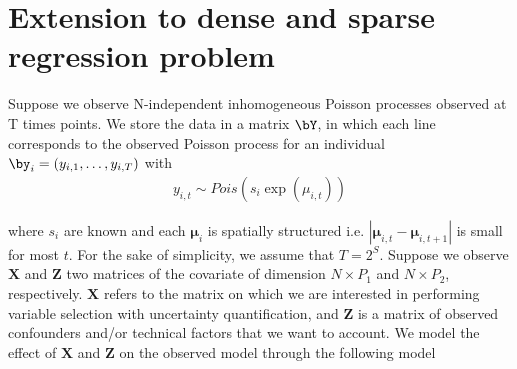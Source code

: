 





\section{Extension to dense and sparse regression problem }


  Suppose we observe N-independent inhomogeneous Poisson processes observed at T times points. We store the data in a matrix $\bY$, in which each line corresponds to the observed  Poisson process for an individual $\by_i= (y_{i,1}, \ldots, y_{i,T})$ with
 \begin{align} \label{eq:Poisson_model_app}
    y_{i,t} \sim Pois(s_i\exp(\mu_{i,t} ))
 \end{align}


where $s_i$ are known and  each  $\bm {\mu}_i$ is spatially structured  i.e. $|\bm {\mu}_{i,t}- \bm {\mu}_{i,t+1}|$ is small for most $t$. For the sake of simplicity, we assume that   $T=2^S$. 
Suppose we observe $\bm{X}$ and $\bm{Z}$ two matrices of the covariate of dimension $N\times P_1$ and $N\times P_2$, respectively.   $\bm{X}$ refers to the matrix on which we are interested in performing variable selection with uncertainty quantification, and  $\bm{Z}$ is a matrix of observed confounders and/or technical factors that we want to account. We model the effect of $\bm{X}$ and $\bm{Z}$  on the observed model through the following model 


